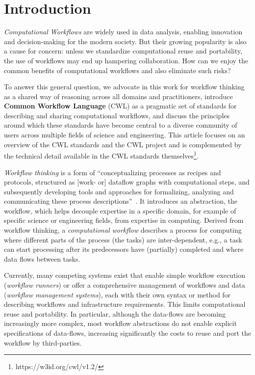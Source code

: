 
\newcommand{\contributor}[3]
{\normalsize\href{#1}{#2} \small(#3)\normalsize}



\section{Introduction} \label{sec:intro}\label{sec:introduction}
\textit{Computational Workflows} are widely used in data analysis, enabling innovation and decision-making for the modern society. But their growing popularity is also a cause for concern: unless we standardize computational reuse and portability, the use of workflows may end up hampering collaboration. How can we enjoy the common benefits of computational workflows and also eliminate such risks?

To answer this general question, we advocate in this work for workflow thinking as a shared way of reasoning across all domains and practitioners, introduce \textbf{Common Workflow Language} (CWL) as a pragmatic set of standards for describing and sharing computational workflows, and discuss the principles around which these standards have become central to a diverse community of users across multiple fields of science and engineering. This article focuses on an overview of the CWL standards and the CWL project and is complemented by the technical detail available in the CWL standards themselves\footnote{https://w3id.org/cwl/v1.2/}.

\textit{Workflow thinking} is a form of ``conceptualizing processes as recipes and protocols, structured as [work- or] dataflow graphs with computational steps, and subsequently developing tools and approaches for formalizing, analyzing and communicating these process descriptions''~\cite{gryk_workflows_2017}. It introduces an abstraction, the workflow, which helps decouple expertise in a specific domain, for example of specific science or engineering fields, from expertise in computing. Derived from workflow thinking, a \textit{computational workflow} describes a process for computing where different parts of the process (the tasks) are inter-dependent, e.g., a task can start processing after its predecessors have (partially) completed and where data flows between tasks.

Currently, many competing systems exist that enable simple workflow execution (\textit{workflow runners}) or offer a comprehensive management of workflows and data (\textit{workflow management systems}), each with their own syntax or method for describing workflows and infrastructure requirements. This limits computational reuse and portability. In particular, although the data-flows are becoming increasingly more complex, most workflow abstractions do not enable explicit specifications of data-flows, increasing significantly the costs to reuse and port the workflow by third-parties.

